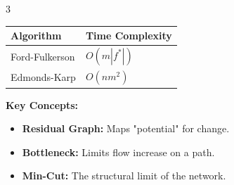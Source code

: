 \documentclass[10pt, a4paper]{article}
\theoremstyle{compact}
\begin{document}
\begin{multicols}{3}
\begin{center}
\begin{tabular}{|l|l|}
\hline
\textbf{Algorithm} & \textbf{Time Complexity} \\ \hline
Ford-Fulkerson & $O(m |f^*|)$ \\ \hline
Edmonds-Karp & $O(nm^2)$ \\ \hline
\end{tabular}
\end{center}

\vspace{0.2cm}
\textbf{Key Concepts:}
\begin{itemize}
    \item \textbf{Residual Graph:} Maps "potential" for change.
    \item \textbf{Bottleneck:} Limits flow increase on a path.
    \item \textbf{Min-Cut:} The structural limit of the network.
\end{itemize}

\end{multicols}
\end{document}
